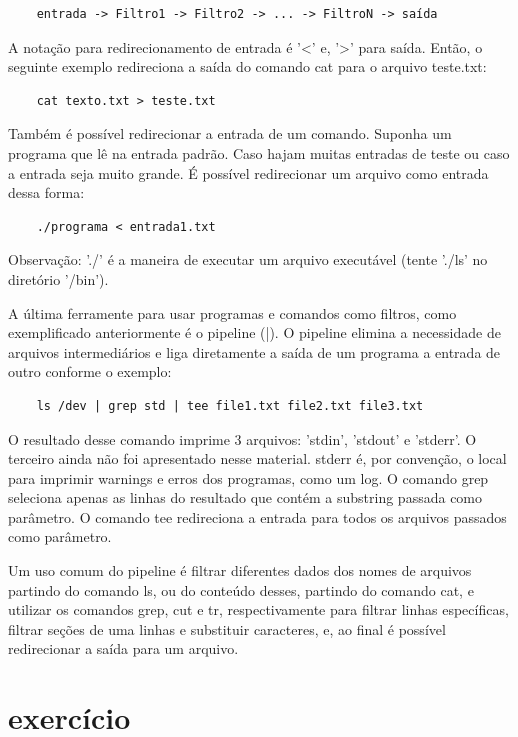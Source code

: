 	\begin{lstlisting}
	entrada -> Filtro1 -> Filtro2 -> ... -> FiltroN -> saída
	\end{lstlisting}
	A notação para redirecionamento de entrada é '<' e, '>' para saída. Então, o seguinte exemplo redireciona a saída do comando cat para o arquivo teste.txt:
	
	\begin{lstlisting}
	cat texto.txt > teste.txt
	\end{lstlisting}
	Também é possível redirecionar a entrada de um comando. Suponha um programa que lê na entrada padrão. Caso hajam muitas entradas de teste ou caso a entrada seja muito grande. É possível redirecionar um arquivo como entrada dessa forma:
	
	\begin{lstlisting}
	./programa < entrada1.txt
	\end{lstlisting}
	Observação: './' é a maneira de executar um arquivo executável (tente './ls' no diretório '/bin').
	
	A última ferramente para usar programas e comandos como filtros, como exemplificado anteriormente é o pipeline (|). O pipeline elimina a necessidade de arquivos intermediários e liga diretamente a saída de um programa a entrada de outro conforme o exemplo:
	
	\begin{lstlisting}
	ls /dev | grep std | tee file1.txt file2.txt file3.txt
	\end{lstlisting}
	O resultado desse comando imprime 3 arquivos: 'stdin', 'stdout' e 'stderr'. O terceiro ainda não foi apresentado nesse material. stderr é, por convenção, o local para imprimir warnings e erros dos programas, como um log.
	O comando grep seleciona apenas as linhas do resultado que contém a substring passada como parâmetro. O comando tee redireciona a entrada para todos os arquivos passados como parâmetro.
	
	Um uso comum do pipeline é filtrar diferentes dados dos nomes de arquivos partindo do comando ls, ou do conteúdo desses, partindo do comando cat, e utilizar os comandos grep, cut e tr, respectivamente para filtrar linhas específicas, filtrar seções de uma linhas e substituir caracteres, e, ao final é possível redirecionar a saída para um arquivo.
	
	\section{exercício}
	
